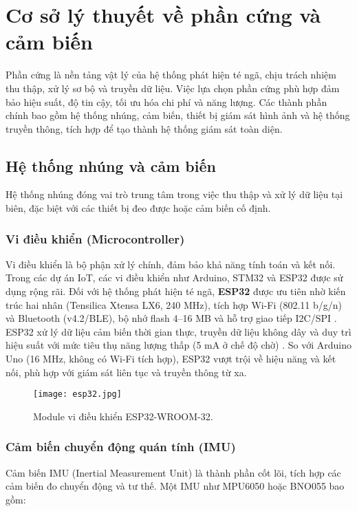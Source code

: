 
\section{Cơ sở lý thuyết về phần cứng và cảm biến}

Phần cứng là nền tảng vật lý của hệ thống phát hiện té ngã, chịu trách nhiệm thu thập, xử lý sơ bộ và truyền dữ liệu. Việc lựa chọn phần cứng phù hợp đảm bảo hiệu suất, độ tin cậy, tối ưu hóa chi phí và năng lượng. Các thành phần chính bao gồm hệ thống nhúng, cảm biến, thiết bị giám sát hình ảnh và hệ thống truyền thông, tích hợp để tạo thành hệ thống giám sát toàn diện.

\subsection{Hệ thống nhúng và cảm biến}

Hệ thống nhúng đóng vai trò trung tâm trong việc thu thập và xử lý dữ liệu tại biên, đặc biệt với các thiết bị đeo được hoặc cảm biến cố định.

\subsubsection{Vi điều khiển (Microcontroller)}
Vi điều khiển là bộ phận xử lý chính, đảm bảo khả năng tính toán và kết nối. Trong các dự án IoT, các vi điều khiển như Arduino, STM32 và ESP32 được sử dụng rộng rãi. Đối với hệ thống phát hiện té ngã, \textbf{ESP32} được ưu tiên nhờ kiến trúc hai nhân (Tensilica Xtensa LX6, 240 MHz), tích hợp Wi-Fi (802.11 b/g/n) và Bluetooth (v4.2/BLE), bộ nhớ flash 4--16 MB và hỗ trợ giao tiếp I2C/SPI \cite{esp32datasheet2023}. ESP32 xử lý dữ liệu cảm biến thời gian thực, truyền dữ liệu không dây và duy trì hiệu suất với mức tiêu thụ năng lượng thấp (5 mA ở chế độ chờ) \cite{iotproject2024}. So với Arduino Uno (16 MHz, không có Wi-Fi tích hợp), ESP32 vượt trội về hiệu năng và kết nối, phù hợp với giám sát liên tục và truyền thông từ xa.

\begin{figure}[ht]
    \centering
    \texttt{[image: esp32.jpg]}
    \caption{Module vi điều khiển ESP32-WROOM-32.}
    \label{fig:esp32}
\end{figure}

\subsubsection{Cảm biến chuyển động quán tính (IMU)}
Cảm biến IMU (Inertial Measurement Unit) là thành phần cốt lõi, tích hợp các cảm biến đo chuyển động và tư thế. Một IMU như MPU6050 hoặc BNO055 bao gồm:

